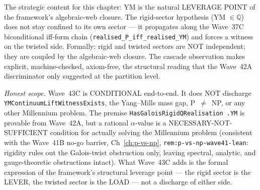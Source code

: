 \begin{remark}
\begin{itemize}
\end{itemize}
The strategic content for this chapter: YM is the natural LEVERAGE POINT of the framework's algebraic-web closure. The rigid-sector hypothesis (YM $\in \mathbb{Q}$) does not stay confined to its own sector --- it propagates along the Wave~37C biconditional iff-form chain (\texttt{realised\_P\_iff\_realised\_YM}) and forces a witness on the twisted side. Formally: rigid and twisted sectors are NOT independent; they are coupled by the algebraic-web closure. The cascade observation makes explicit, machine-checked, axiom-free, the structural reading that the Wave~42A discriminator only suggested at the partition level.

\emph{Honest scope.} Wave~43C is CONDITIONAL end-to-end. It does NOT discharge \texttt{YMContinuumLiftWitnessExists}, the Yang--Mills mass gap, P~$\neq$~NP, or any other Millennium problem. The premise \texttt{HasGaloisRigidQRealisation .YM} is provable from Wave~42A, but a rational $\alpha$-value is a NECESSARY-NOT-SUFFICIENT condition for actually solving the Millennium problem (consistent with the Wave~41B no-go barrier, Ch~\ref{ch:p-vs-np}, \texttt{rem:p-vs-np-wave41-lean}: rigidity rules out the Galois-twist obstruction only, leaving spectral, analytic, and gauge-theoretic obstructions intact). What Wave~43C adds is the formal expression of the framework's structural leverage point --- the rigid sector is the LEVER, the twisted sector is the LOAD --- not a discharge of either side.
\end{remark}

